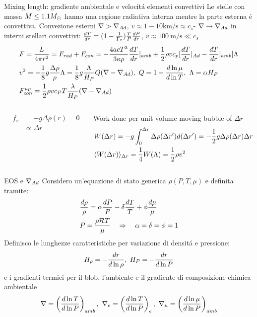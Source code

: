 \begin{frame}{Mixing length: gradiente ambientale e velocit\'a elementi convettivi}
Le stelle con massa $M\leq1.1\msun{}$ hanno una regione radiativa interna mentre la parte esterna \'e convettiva. Convezione esterni $\nabla>\nad$, $v\approx1-10\si{\kilo\meter\per\second}\approx c_s$- $\nabla\to\nad{}$ in interni stellari convettivi: $\TDy{r}{T}=(1-\frac{1}{\Gamma_2})\frac{T}{P}\TDy{r}{P}$, $v\approx\SI{100}{\meter\per\second}\ll c_s$
	\begin{align*}
&F=\frac{L}{4\pi r^2}=F_{rad}+F_{con}=-\frac{4acT^3}{3\kappa\rho}\TDy{r}{T}|_{amb}+\frac{1}{2}\rho vc_p[\TDy{r}{T}|_{Ad}-\TDy{r}{T}|_{amb}]\Lambda\\
&v^2=-\frac{1}{8}g\frac{\Delta\rho}{\rho}\Lambda=\frac{1}{8}g\frac{\Lambda}{H_P}Q(\nabla-\nad),\ Q=1-\TDly{T}{\mu},\ \Lambda=\alpha H_P\\
&F_{con}^{up}=\frac{1}{2}\rho vc_PT\frac{\lambda}{H_P}(\nabla-\nad{})
\end{align*}
\begin{columns}[T]
\begin{column}{0.2\textwidth}
\begin{align*}
&f_r&=-g\Delta\rho(r)=0\tag*{r}\\
&&\propto\Delta r
\end{align*}
\end{column}
\begin{column}{0.8\textwidth}
Work done per unit volume moving bubble of $\Delta r$
\begin{align*}
&W(\Delta r)=-g\int_0^{\Delta r}\Delta\rho(\Delta r')d(\Delta r')=-\frac{1}{2}g\Delta\rho(\Delta r)\Delta r\\
&\exv{W(\Delta r)}_{\Delta r}=\frac{1}{4}W(\Lambda)=\frac{1}{2}\rho v^2
\end{align*}
\end{column}\end{columns}
\end{frame}

\begin{wordonframe}{EOS e $\nad{}$}
Considero un'equazione di stato generica $\rho(P,T,\mu)$ e definita tramite:
\begin{align*}
&\frac{d\rho}{\rho}=\alpha\frac{dP}{P}-\delta\frac{dT}{T}+\phi\frac{d\mu}{\mu}\\
&P=\frac{\rho\gasconstant{}T}{\mu}\quad\Rightarrow\quad\alpha=\delta=\phi=1
\end{align*}
Definisco le lunghezze caratteristiche per variazione di densit\'a e pressione:
\begin{equation*}
\densityscale{}=-\frac{dr}{d\ln{\rho}},\ H_P=-\frac{dr}{d\ln{P}}
\end{equation*}
e i gradienti termici per il blob, l'ambiente e il gradiente di composizione chimica ambientale
\begin{equation*}
\nabla=\Dcvar{\TDly{P}{T}}{amb},\ \nabla_e=\Dcvar{\TDly{P}{T}}{e},\ \nmu{}=\Dcvar{\TDly{P}{\mu}}{amb}
\end{equation*}
\end{wordonframe}

